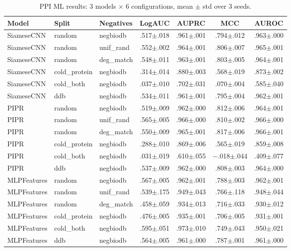 \begin{table}[h]
\centering
\caption{PPI ML results: 3 models $\times$ 6 configurations, mean $\pm$ std over 3 seeds.}
\label{tab:ppi_ml_full}
\scriptsize
\begin{tabular}{@{}lllcccc@{}}
\toprule
\textbf{Model} & \textbf{Split} & \textbf{Negatives} & \textbf{LogAUC} & \textbf{AUPRC} & \textbf{MCC} & \textbf{AUROC} \\
\midrule
SiameseCNN & random & negbiodb & .517$\pm$.018 & .961$\pm$.001 & .794$\pm$.012 & .963$\pm$.000 \\
SiameseCNN & random & unif\_rand & .552$\pm$.002 & .964$\pm$.001 & .806$\pm$.007 & .965$\pm$.001 \\
SiameseCNN & random & deg\_match & .548$\pm$.011 & .963$\pm$.001 & .803$\pm$.005 & .964$\pm$.001 \\
SiameseCNN & cold\_protein & negbiodb & .314$\pm$.014 & .880$\pm$.003 & .568$\pm$.019 & .873$\pm$.002 \\
SiameseCNN & cold\_both & negbiodb & .037$\pm$.010 & .702$\pm$.031 & .070$\pm$.004 & .585$\pm$.040 \\
SiameseCNN & ddb & negbiodb & .534$\pm$.011 & .961$\pm$.001 & .795$\pm$.004 & .962$\pm$.001 \\
\midrule
PIPR & random & negbiodb & .519$\pm$.009 & .962$\pm$.000 & .812$\pm$.006 & .964$\pm$.001 \\
PIPR & random & unif\_rand & .565$\pm$.005 & .966$\pm$.000 & .810$\pm$.002 & .966$\pm$.000 \\
PIPR & random & deg\_match & .550$\pm$.009 & .965$\pm$.001 & .817$\pm$.006 & .966$\pm$.001 \\
PIPR & cold\_protein & negbiodb & .288$\pm$.010 & .869$\pm$.006 & .565$\pm$.019 & .859$\pm$.008 \\
PIPR & cold\_both & negbiodb & .031$\pm$.019 & .610$\pm$.055 & $-$.018$\pm$.044 & .409$\pm$.077 \\
PIPR & ddb & negbiodb & .537$\pm$.009 & .962$\pm$.000 & .808$\pm$.003 & .964$\pm$.000 \\
\midrule
MLPFeatures & random & negbiodb & .567$\pm$.005 & .962$\pm$.001 & .788$\pm$.003 & .962$\pm$.001 \\
MLPFeatures & random & unif\_rand & .539$\pm$.175 & .949$\pm$.043 & .766$\pm$.118 & .948$\pm$.044 \\
MLPFeatures & random & deg\_match & .458$\pm$.059 & .934$\pm$.013 & .716$\pm$.033 & .930$\pm$.012 \\
MLPFeatures & cold\_protein & negbiodb & .476$\pm$.005 & .935$\pm$.001 & .706$\pm$.005 & .931$\pm$.001 \\
MLPFeatures & cold\_both & negbiodb & .595$\pm$.051 & .973$\pm$.010 & .749$\pm$.043 & .950$\pm$.021 \\
MLPFeatures & ddb & negbiodb & .564$\pm$.005 & .961$\pm$.000 & .787$\pm$.001 & .961$\pm$.000 \\
\bottomrule
\end{tabular}
\end{table}
